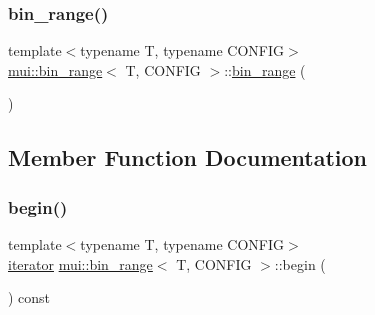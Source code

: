 \mbox{\label{structmui_1_1bin__range_a6fa60344f15c152723ac5bda585b707d}} 
\subsubsection{\texorpdfstring{bin\+\_\+range()}{bin\_range()}\hspace{0.1cm}{\footnotesize\ttfamily [2/2]}}
{\footnotesize\ttfamily template$<$typename T, typename C\+O\+N\+F\+IG$>$ \\
\hyperlink{structmui_1_1bin__range}{mui\+::bin\+\_\+range}$<$ T, C\+O\+N\+F\+IG $>$\+::\hyperlink{structmui_1_1bin__range}{bin\+\_\+range} (\begin{DoxyParamCaption}\item[{const \hyperlink{structmui_1_1bin__range}{bin\+\_\+range}$<$ T, C\+O\+N\+F\+IG $>$ \&}]{ }\end{DoxyParamCaption})\hspace{0.3cm}{\ttfamily [default]}}



\subsection{Member Function Documentation}
\mbox{\label{structmui_1_1bin__range_a88d3f67ab1057072e6e9baa8cc153951}} 
\subsubsection{\texorpdfstring{begin()}{begin()}}
{\footnotesize\ttfamily template$<$typename T, typename C\+O\+N\+F\+IG$>$ \\
\hyperlink{structmui_1_1bin__range_ad39d02903689c0911cffe91dc8634297}{iterator} \hyperlink{structmui_1_1bin__range}{mui\+::bin\+\_\+range}$<$ T, C\+O\+N\+F\+IG $>$\+::begin (\begin{DoxyParamCaption}{ }\end{DoxyParamCaption}) const\hspace{0.3cm}{\ttfamily [inline]}}

\mbox{\label{structmui_1_1bin__range_aa495ff09ee344767ed68234edbaa6b9c}} 
